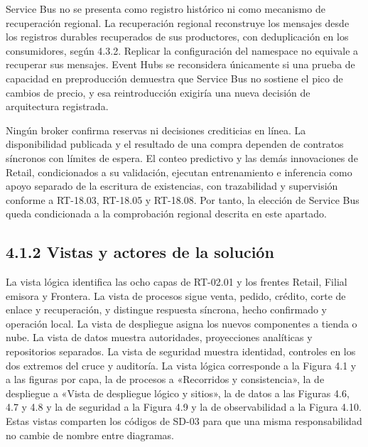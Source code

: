 \documentclass[11pt]{article}
\begin{document}
Service Bus no se presenta como registro histórico ni como mecanismo de recuperación regional. La recuperación regional reconstruye los mensajes desde los registros durables recuperados de sus productores, con deduplicación en los consumidores, según 4.3.2. Replicar la configuración del namespace no equivale a recuperar sus mensajes. Event Hubs se reconsidera únicamente si una prueba de capacidad en preproducción demuestra que Service Bus no sostiene el pico de cambios de precio, y esa reintroducción exigiría una nueva decisión de arquitectura registrada.

Ningún broker confirma reservas ni decisiones crediticias en línea. La disponibilidad publicada y el resultado de una compra dependen de contratos síncronos con límites de espera. El conteo predictivo y las demás innovaciones de Retail, condicionados a su validación, ejecutan entrenamiento e inferencia como apoyo separado de la escritura de existencias, con trazabilidad y supervisión conforme a RT-18.03, RT-18.05 y RT-18.08. Por tanto, la elección de Service Bus queda condicionada a la comprobación regional descrita en este apartado.

\subsection{4.1.2 Vistas y actores de la solución}

La vista lógica identifica las ocho capas de RT-02.01 y los frentes Retail, Filial emisora y Frontera. La vista de procesos sigue venta, pedido, crédito, corte de enlace y recuperación, y distingue respuesta síncrona, hecho confirmado y operación local. La vista de despliegue asigna los nuevos componentes a tienda o nube. La vista de datos muestra autoridades, proyecciones analíticas y repositorios separados. La vista de seguridad muestra identidad, controles en los dos extremos del cruce y auditoría. La vista lógica corresponde a la Figura 4.1 y a las figuras por capa, la de procesos a «Recorridos y consistencia», la de despliegue a «Vista de despliegue lógico y sitios», la de datos a las Figuras 4.6, 4.7 y 4.8 y la de seguridad a la Figura 4.9 y la de observabilidad a la Figura 4.10. Estas vistas comparten los códigos de SD-03 para que una misma responsabilidad no cambie de nombre entre diagramas.
\end{document}
